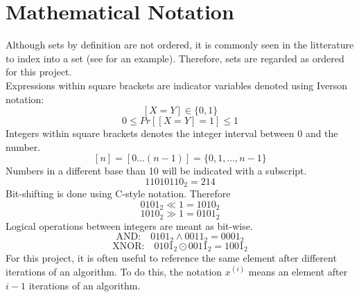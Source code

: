 \section{Mathematical Notation}
Although sets by definition are not ordered, it is commonly seen in the litterature to index into a set (see \cite{fast-similarity-search} for an example). Therefore, sets are regarded as ordered for this project.\\
Expressions within square brackets are indicator variables denoted using Iverson notation:
$$[X = Y] \in \{0, 1\}$$
$$0 \leq Pr[[X = Y] = 1] \leq 1$$
Integers within square brackets denotes the integer interval between 0 and the number.
$$[n] = [0 \dots (n-1)] = \{ 0, 1, \dots, n-1\}$$
Numbers in a different base than 10 will be indicated with a subscript.
$$11010110_2 = 214$$
Bit-shifting is done using C-style notation. Therefore 
$$0101_2 \ll 1 = 1010_2$$
$$1010_2 \gg 1 = 0101_2$$
Logical operations between integers are meant as bit-wise.
$$\textrm{AND:}\quad 0101_2 \land 0011_2 = 0001_2$$
$$\textrm{XNOR:}\quad 0101_2 \odot 0011_2 = 1001_2$$
For this project, it is often useful to reference the same element after different iterations of an algorithm. To do this, the notation $x^{(i)}$ means an element after $i-1$ iterations of an algorithm.
